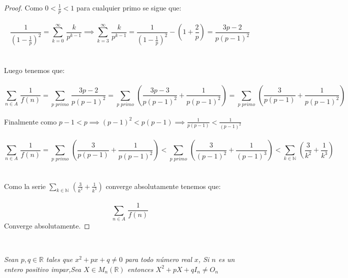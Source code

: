 \documentclass[11pt,letterpaper]{article}
\newcommand{\R}{\mathbb{R}}
\newcommand{\N}{\mathbb{N}}
\begin{document}
\begin{proof}
    Como $0<\frac{1}{p}<1$ para cualquier primo se sigue que:\,\\
    \,\\
    \begin{equation*}
        \frac{1}{\left(1-\frac{1}{p}\right)^2}=\sum_{k=0}^{\infty}\,\frac{k}{p^{k-1}}\implies \sum_{k=3}^{\infty}\,\frac{k}{p^{k-1}}=\frac{1}{\left(1-\frac{1}{p}\right)^2}-\left(1+\frac{2}{p}\right)=\frac{3p-2}{p(p-1)^2}
    \end{equation*}\,\\
    \,\\
    Luego tenemos que:\,\\
    \,\\
    \begin{equation*}
        \sum_{n\in A}\,\frac{1}{f(n)}=\sum_{p\,\,primo}\,\frac{3p-2}{p(p-1)^2}=\sum_{p\,\,primo}\,\left(\frac{3p-3}{p(p-1)^2}+\frac{1}{p(p-1)^2}\right)=\sum_{p\,\,primo}\,\left(\frac{3}{p(p-1)}+\frac{1}{p(p-1)^2}\right)
    \end{equation*}\,\\
    Finalmente como $p-1<p\implies (p-1)^2<p(p-1)\implies \frac{1}{p(p-1)}<\frac{1}{(p-1)^2}$\,\\
    \,\\
    \begin{equation*}
        \sum_{n\in A}\,\frac{1}{f(n)}=\sum_{p\,\,primo}\,\left(\frac{3}{p(p-1)}+\frac{1}{p(p-1)^2}\right)<\sum_{p\,\,primo}\,\left(\frac{3}{(p-1)^2}+\frac{1}{(p-1)^3}\right)<\displaystyle\sum_{k\in \N}\,\left(\frac{3}{k^2}+\frac{1}{k^3}\right)
    \end{equation*}\,\\
    \,\\
    Como la serie $\displaystyle\sum_{k\in \N}\,\left(\frac{3}{k^2}+\frac{1}{k^3}\right)$ converge absolutamente tenemos que:\,\\
    \,\\
\begin{equation*}
    \sum_{n\in A}\,\frac{1}{f(n)}
\end{equation*}
Converge absolutamente.
\end{proof}\,\\
\begin{tcolorbox}[
	title = \textcolor{black}{\textcolor{white}{Problema 3}},]
\textit{Sean $p,q\in \R$ tales que $x^2+px+q\neq 0$ para todo n\'umero real $x$, Si $n$ es un entero positivo impar,Sea
$X\in M_n(\R)$ entonces $X^2+pX+qI_n\neq O_n$
}
\end{tcolorbox}
\end{document}
